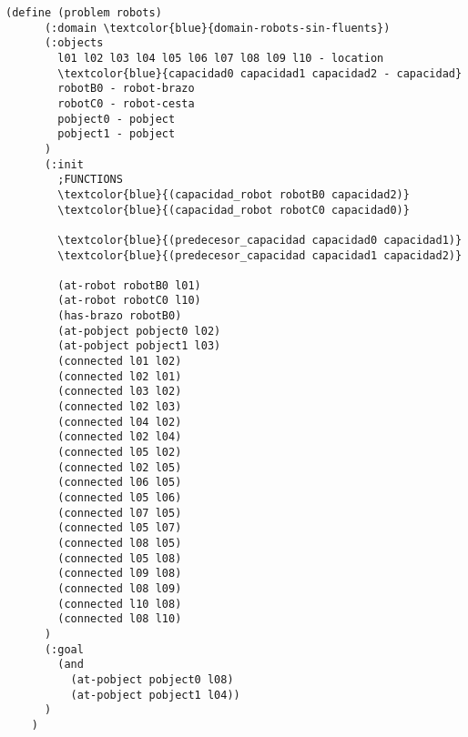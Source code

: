\documentclass{article}
\begin{document}
\begin{Verbatim}[commandchars=\\\{\}]
    (define (problem robots)
      (:domain \textcolor{blue}{domain-robots-sin-fluents})
      (:objects
        l01 l02 l03 l04 l05 l06 l07 l08 l09 l10 - location
        \textcolor{blue}{capacidad0 capacidad1 capacidad2 - capacidad}
        robotB0 - robot-brazo
        robotC0 - robot-cesta
        pobject0 - pobject
        pobject1 - pobject
      )
      (:init
        ;FUNCTIONS
        \textcolor{blue}{(capacidad_robot robotB0 capacidad2)}
        \textcolor{blue}{(capacidad_robot robotC0 capacidad0)}
    
        \textcolor{blue}{(predecesor_capacidad capacidad0 capacidad1)}
        \textcolor{blue}{(predecesor_capacidad capacidad1 capacidad2)}
    
        (at-robot robotB0 l01)
        (at-robot robotC0 l10)
        (has-brazo robotB0)
        (at-pobject pobject0 l02)
        (at-pobject pobject1 l03)
        (connected l01 l02)
        (connected l02 l01)
        (connected l03 l02)
        (connected l02 l03)
        (connected l04 l02)
        (connected l02 l04)
        (connected l05 l02)
        (connected l02 l05)
        (connected l06 l05)
        (connected l05 l06)
        (connected l07 l05)
        (connected l05 l07)
        (connected l08 l05)
        (connected l05 l08)
        (connected l09 l08)
        (connected l08 l09)
        (connected l10 l08)
        (connected l08 l10)
      )
      (:goal
        (and
          (at-pobject pobject0 l08)
          (at-pobject pobject1 l04))
      )
    )
\end{Verbatim}
\end{document}
